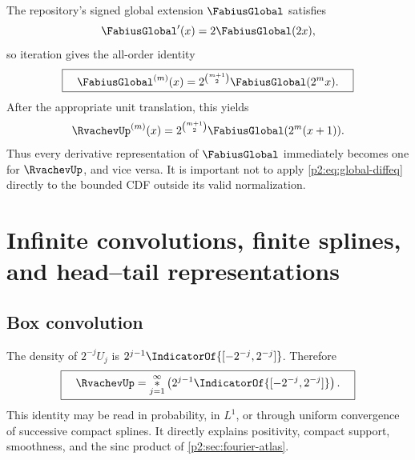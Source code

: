 \documentclass[11pt]{article}
\theoremstyle{definition}
\theoremstyle{remark}
\begin{document}
The repository's signed global extension $\FabiusGlobal$ satisfies
\begin{equation}
 \FabiusGlobal'(x)=2\FabiusGlobal(2x),                                   \label{p2:eq:global-diffeq}
\end{equation}
so iteration gives the all-order identity
\begin{equation}
 \boxed{\quad
 \FabiusGlobal^{(m)}(x)=2^{\binom{m+1}{2}}\FabiusGlobal(2^m x).
 \quad}                                                  \label{p2:eq:global-derivative-tower}
\end{equation}
After the appropriate unit translation, this yields
\begin{equation}
 \RvachevUp^{(m)}(x)=2^{\binom{m+1}{2}}\FabiusGlobal(2^m(x+1)).         \label{p2:eq:up-derivative-tower}
\end{equation}
Thus every derivative representation of $\FabiusGlobal$ immediately becomes one for $\RvachevUp$, and
vice versa.  It is important not to apply \eqref{p2:eq:global-diffeq} directly to the bounded
CDF outside its valid normalization.

\section{Infinite convolutions, finite splines, and head--tail representations}
\label{p2:sec:convolution}

\subsection{Box convolution}

The density of $2^{-j}U_j$ is $2^{j-1}\IndicatorOf{[-2^{-j},2^{-j}]}$.  Therefore
\begin{equation}
 \boxed{\quad
 \RvachevUp=\mathop{\ast}_{j=1}^{\infty}
 \left(2^{j-1}\IndicatorOf{[-2^{-j},2^{-j}]}\right).
 \quad}                                                  \label{p2:eq:infinite-box-convolution}
\end{equation}
This identity may be read in probability, in $L^1$, or through uniform convergence of
successive compact splines.  It directly explains positivity, compact support, smoothness,
and the sinc product of \cref{p2:sec:fourier-atlas}.
\end{document}
